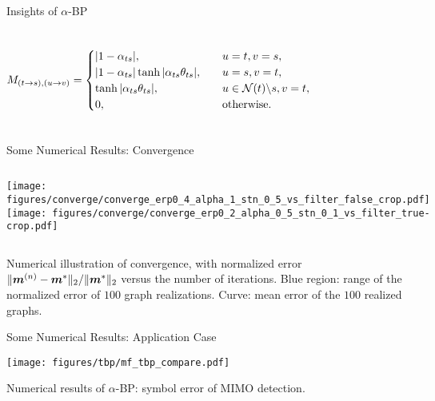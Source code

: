 \begin{frame}{Insights of $\alpha$-BP}
{\begin{columns}
      \begin{align*}
        M_{(t\rightarrow s), (u \rightarrow v)} =
        \begin{cases}
          |  1 - \alpha_{ts} |, &\quad u=t, v=s, \\
          |  1 - \alpha_{ts} | \tanh | \alpha_{ts} \theta_{ts} |, & \quad u = s, v =t, \\
          \tanh| \alpha_{ts} \theta_{ts} |, & \quad u \in \mathcal{N}(t)\backslash s, v = t, \\
          0, & \quad \mathrm{otherwise}.
        \end{cases}
      \end{align*}
    \end{columns}
  }
\end{frame}
\begin{frame}{Some Numerical Results: Convergence}
  
  \graphicspath{{../source/chapter3/}}
  \begin{columns}
    \texttt{[image: figures/converge/converge\_erp0\_4\_alpha\_1\_stn\_0\_5\_vs\_filter\_false\_crop.pdf]}
    \texttt{[image: figures/converge/converge\_erp0\_2\_alpha\_0\_5\_stn\_0\_1\_vs\_filter\_true-crop.pdf]}
  \end{columns}
  \centering
  {Numerical illustration of convergence, with normalized error ${\| \bm{m}^{(n)}-\bm{m}^{\ast} \|_{2}}/{\| \bm{m}^{\ast} \|_{2}}$ versus the number of iterations. Blue region: range of the normalized error of $100$ graph realizations. Curve: mean error of the $100$ realized graphs. }

\end{frame}

\begin{frame}{Some Numerical Results: Application Case}
  \graphicspath{{../source/chapter3/}}
  \centering
  \texttt{[image: figures/tbp/mf\_tbp\_compare.pdf]}

  \centering
  {Numerical results of $\alpha$-BP: symbol error of MIMO detection.}

\end{frame}


